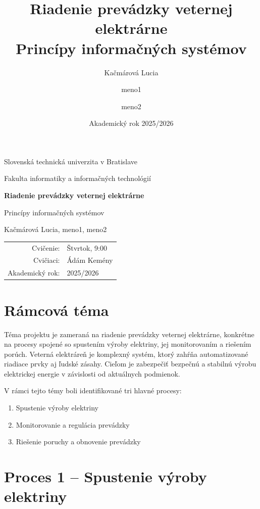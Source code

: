 \documentclass[12pt,a4paper]{article}
\title{Riadenie prevádzky veternej elektrárne\\Princípy informačných systémov}
\author{Kačmárová Lucia \and meno1 \and meno2}
\date{Akademický rok 2025/2026}
\begin{document}
\hypersetup{pageanchor=false}
\begin{titlepage}
  \centering
  {\Large Slovenská technická univerzita v Bratislave\par}
  {\Large Fakulta informatiky a informačných technológií\par}
  \vspace{3cm}
  {\huge\bfseries Riadenie prevádzky veternej elektrárne\par}
  \vspace{0.5cm}
  {\Large Princípy informačných systémov\par}
  \vspace{2.5cm}

  {\large Kačmárová Lucia, meno1, meno2\par}
  \vfill

  \begin{tabular}{rl}
    Cvičenie: & Štvrtok, 9:00 \\
    Cvičiaci: & Ádám Kemény \\
    Akademický rok: & 2025/2026 \\
  \end{tabular}
\end{titlepage}
\hypersetup{pageanchor=true}

\tableofcontents
\newpage

\section{Rámcová téma}
Téma projektu je zameraná na riadenie prevádzky veternej elektrárne, konkrétne na procesy spojené so spustením výroby elektriny, jej monitorovaním a riešením porúch. Veterná elektráreň je komplexný systém, ktorý zahŕňa automatizované riadiace prvky aj ľudské zásahy. Cieľom je zabezpečiť bezpečnú a stabilnú výrobu elektrickej energie v závislosti od aktuálnych podmienok.

V rámci tejto témy boli identifikované tri hlavné procesy:
\begin{enumerate}
  \item Spustenie výroby elektriny
  \item Monitorovanie a regulácia prevádzky
  \item Riešenie poruchy a obnovenie prevádzky
\end{enumerate}

\section{Proces 1 -- Spustenie výroby elektriny}
\end{document}
